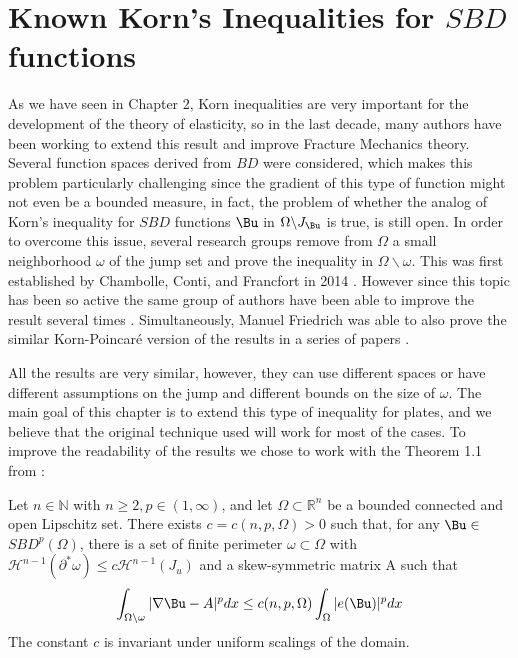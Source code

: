 \section[Known Korn's Inequalities for SBD functions]{Known Korn's Inequalities for $SBD$ functions}
\label{sec:kornBulkSBD}
As we have seen in Chapter 2, Korn inequalities are very important for the development of the theory of elasticity, so in the last decade, many authors have been working to extend this result and improve Fracture Mechanics theory. 
Several function spaces derived from $BD$ were considered, which makes this problem particularly challenging since the gradient of this type of function might not even be a bounded measure, in fact, the problem of whether the analog of Korn’s inequality for $SBD$ functions $\Bu$ in $\Omega\backslash J_\Bu$ is true, is still open.  In order to overcome this issue, several research groups remove from $\Omega$ a small neighborhood $\omega$ of the jump set and prove the inequality in $\Omega\backslash\omega$. This was first established by Chambolle, Conti, and Francfort in 2014 \cite{kornBD1}. However since this topic has been so active the same group of authors have been able to improve the result several times \cite{kornBD2, kornBD3}. Simultaneously, Manuel Friedrich was able to also prove the similar Korn-Poincaré version of the results in a series of papers \cite{kornBD4, kornBD5}.

All the results are very similar, however, they can use different spaces or have different assumptions on the jump and different bounds on the size of $\omega$. The main goal of this chapter is to extend this type of inequality for plates, and we believe that the original technique used will work for most of the cases. To improve the readability of the results we chose to work with the Theorem 1.1 from \cite{kornBD3}:
    
\begin{theorem}\label{KornBDGeneralDomain}
    Let $n \in \mathbb{N}$ with $n \geq 2, p \in(1, \infty)$, and let $\Omega \subset \mathbb{R}^n$ be a bounded connected and open Lipschitz set. There exists $c=c(n, p, \Omega)>0$ such that, for any $\Bu \in$ $ S B D^p(\Omega)$, there is a set of finite perimeter $\omega \subset \Omega$ with $\mathcal{H}^{n-1}\left(\partial^* \omega\right) \leq c \mathcal{H}^{n-1}\left(J_u\right)$ and a skew-symmetric matrix A such that
    $$
    \int_{\Omega\backslash\omega}|\nabla \Bu-A|^p dx \leq c(n, p, \Omega) \int_{\Omega} |e(\Bu)|^p dx
    $$
    The constant $c$ is invariant under uniform scalings of the domain.
\end{theorem}

